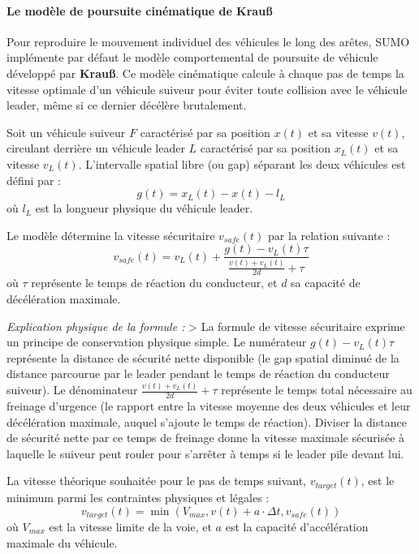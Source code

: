 \documentclass[10pt, a4paper]{article}
\begin{document}
\paragraph{Le modèle de poursuite cinématique de
Krauß}\label{le-moduxe8le-de-poursuite-cinuxe9matique-de-krauuxdf}

Pour reproduire le mouvement individuel des véhicules le long des
arêtes, SUMO implémente par défaut le modèle comportemental de poursuite
de véhicule développé par \textbf{Krauß}. Ce modèle cinématique calcule
à chaque pas de temps la vitesse optimale d'un véhicule suiveur pour
éviter toute collision avec le véhicule leader, même si ce dernier
décélère brutalement.

Soit un véhicule suiveur \(F\) caractérisé par sa position \(x(t)\) et
sa vitesse \(v(t)\), circulant derrière un véhicule leader \(L\)
caractérisé par sa position \(x_L(t)\) et sa vitesse \(v_L(t)\).
L'intervalle spatial libre (ou gap) séparant les deux véhicules est
défini par : \[g(t) = x_L(t) - x(t) - l_L\] où \(l_L\) est la longueur
physique du véhicule leader.

Le modèle détermine la vitesse sécuritaire \(v_{safe}(t)\) par la
relation suivante :
\[v_{safe}(t) = v_L(t) + \frac{g(t) - v_L(t)\tau}{\frac{v(t) + v_L(t)}{2d} + \tau}\]
où \(\tau\) représente le temps de réaction du conducteur, et \(d\) sa
capacité de décélération maximale.

\emph{Explication physique de la formule :} \textgreater{} La formule de
vitesse sécuritaire exprime un principe de conservation physique simple.
Le numérateur \(g(t) - v_L(t)\tau\) représente la distance de sécurité
nette disponible (le gap spatial diminué de la distance parcourue par le
leader pendant le temps de réaction du conducteur suiveur). Le
dénominateur \(\frac{v(t) + v_L(t)}{2d} + \tau\) représente le temps
total nécessaire au freinage d'urgence (le rapport entre la vitesse
moyenne des deux véhicules et leur décélération maximale, auquel
s'ajoute le temps de réaction). Diviser la distance de sécurité nette
par ce temps de freinage donne la vitesse maximale sécurisée à laquelle
le suiveur peut rouler pour s'arrêter à temps si le leader pile devant
lui.

La vitesse théorique souhaitée pour le pas de temps suivant,
\(v_{target}(t)\), est le minimum parmi les contraintes physiques et
légales :
\[v_{target}(t) = \min\left( V_{max}, v(t) + a \cdot \Delta t, v_{safe}(t) \right)\]
où \(V_{max}\) est la vitesse limite de la voie, et \(a\) est la
capacité d'accélération maximale du véhicule.
\end{document}
